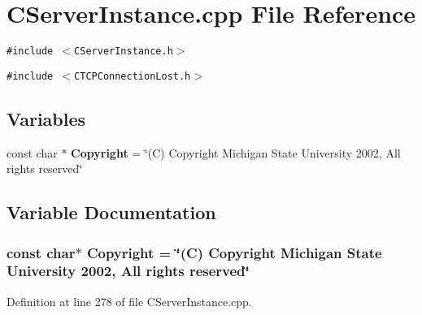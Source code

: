 \section{CServer\-Instance.cpp File Reference}
\label{CServerInstance_8cpp}
{\tt \#include $<$CServer\-Instance.h$>$}\par
{\tt \#include $<$CTCPConnection\-Lost.h$>$}\par
\subsection*{Variables}
\begin{CompactItemize}
\item 
const char $\ast$ {\bf Copyright} = \char`\"{}(C) Copyright Michigan State University 2002, All rights reserved\char`\"{}
\end{CompactItemize}


\subsection{Variable Documentation}
\subsubsection{\setlength{\rightskip}{0pt plus 5cm}const char$\ast$ Copyright = \char`\"{}(C) Copyright Michigan State University 2002, All rights reserved\char`\"{}\hspace{0.3cm}{\tt  [static]}}\label{CServerInstance_8cpp_a0}




Definition at line 278 of file CServer\-Instance.cpp.